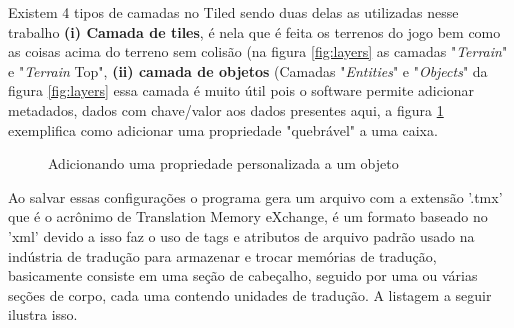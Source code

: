 Existem 4 tipos de camadas no Tiled sendo duas delas as utilizadas nesse trabalho  \textbf{(i) Camada de tiles}, é nela que é feita os terrenos do jogo bem como as coisas acima do terreno sem colisão (na figura \ref{fig:layers} as camadas "\textit{Terrain}" e "\textit{Terrain} Top", \textbf{(ii) camada de objetos} (Camadas "\textit{Entities}" e "\textit{Objects}" da figura
\ref{fig:layers} essa camada é muito útil pois o software permite adicionar metadados, dados com chave/valor aos dados presentes aqui, a figura \ref{fig:add-custom-property-object} exemplifica como adicionar uma propriedade "quebrável" a uma caixa.
\begin{figure}[h!]
    \caption{Adicionando uma propriedade personalizada a um objeto}
    \label{fig:add-custom-property-object}
    \hfill
\end{figure}
Ao salvar essas configurações o programa gera um arquivo com a extensão '.tmx' que é o acrônimo de Translation Memory eXchange, é um formato baseado no 'xml' devido a isso faz o uso de tags e atributos de arquivo padrão usado na indústria de tradução para armazenar e trocar memórias de tradução, basicamente consiste em uma seção de cabeçalho, seguido por uma ou várias seções de corpo, cada uma contendo unidades de tradução. A listagem a seguir ilustra isso.

